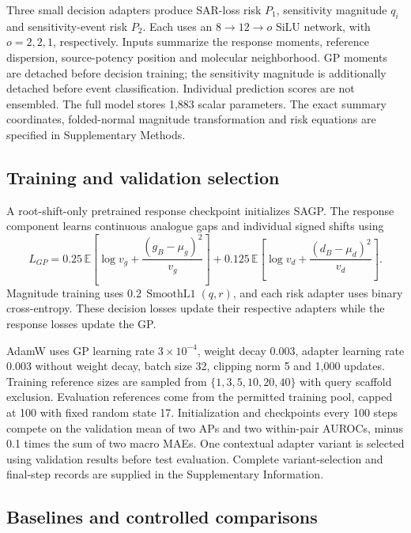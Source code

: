 \documentclass[letterpaper]{article}
\begin{document}
Three small decision adapters produce SAR-loss risk $P_1$, sensitivity magnitude $q_i$ and sensitivity-event risk $P_2$. Each uses an $8\rightarrow12\rightarrow o$ SiLU network, with $o=2,2,1$, respectively. Inputs summarize the response moments, reference dispersion, source-potency position and molecular neighborhood. GP moments are detached before decision training; the sensitivity magnitude is additionally detached before event classification. Individual prediction scores are not ensembled. The full model stores 1,883 scalar parameters. The exact summary coordinates, folded-normal magnitude transformation and risk equations are specified in Supplementary Methods.

\subsection{Training and validation selection}

A root-shift-only pretrained response checkpoint initializes SAGP. The response component learns continuous analogue gaps and individual signed shifts using
\begin{equation}
 L_{GP}=0.25\,\mathbb{E}\!\left[\log v_g+\frac{(g_B-\mu_g)^2}{v_g}\right]
 +0.125\,\mathbb{E}\!\left[\log v_d+\frac{(d_B-\mu_d)^2}{v_d}\right].
\end{equation}
Magnitude training uses $0.2\,\operatorname{SmoothL1}(q,r)$, and each risk adapter uses binary cross-entropy. These decision losses update their respective adapters while the response losses update the GP.

AdamW uses GP learning rate $3\times10^{-4}$, weight decay 0.003, adapter learning rate 0.003 without weight decay, batch size 32, clipping norm 5 and 1,000 updates. Training reference sizes are sampled from $\{1,3,5,10,20,40\}$ with query scaffold exclusion. Evaluation references come from the permitted training pool, capped at 100 with fixed random state 17. Initialization and checkpoints every 100 steps compete on the validation mean of two APs and two within-pair AUROCs, minus 0.1 times the sum of two macro MAEs. One contextual adapter variant is selected using validation results before test evaluation. Complete variant-selection and final-step records are supplied in the Supplementary Information.

\subsection{Baselines and controlled comparisons}
\end{document}
